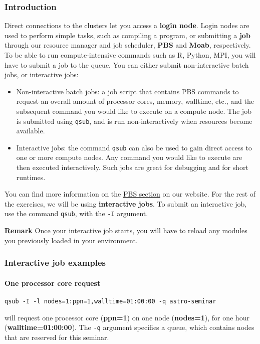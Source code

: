\documentclass[letterpaper,10pt]{article}
\begin{document}
\subsubsection{Introduction}
Direct connections to the clusters let you access a \textbf{login node}. Login nodes are used to perform simple tasks, such as compiling a program, or submitting a \textbf{job} through our resource manager and job scheduler, \textbf{PBS} and \textbf{Moab}, respectively. 
To be able to run compute-intensive commands such as R, Python, MPI, you will have to submit a job to the queue. You can either submit non-interactive batch jobs, or interactive jobs:
\begin{itemize}
 \item Non-interactive batch jobs: a job script that contains PBS commands to request an overall amount of processor cores, memory, walltime, etc., and the subsequent command you would like to execute on a compute node. The job is submitted using \texttt{qsub}, and is run non-interactively 
 when resources become available.
 \item Interactive jobs: the command \texttt{qsub} can also be used to gain direct access to one or more compute nodes. Any command you would like to execute are then executed interactively. Such jobs are great for debugging and for short runtimes.
\end{itemize}
You can find more information on the \href{http://rcc.its.psu.edu/user_guides/system_utilities/pbs/}{PBS section} on our website. 
For the rest of the exercises, we will be using \textbf{interactive jobs}. To submit an interactive job, use the command \texttt{qsub}, with the \texttt{-I} argument.

\textbf{Remark} Once your interactive job starts, you will have to reload any modules you previously loaded in your environment.


\subsubsection{Interactive job examples}
\paragraph{One processor core request}
\begin{center}
\texttt{qsub -I -l nodes=1:ppn=1,walltime=01:00:00 -q astro-seminar}
\end{center}

will request one processor core (\textbf{ppn=1}) on one node (\textbf{nodes=1}), for one hour (\textbf{walltime=01:00:00}). The \texttt{-q} argument specifies a queue, which contains nodes that are reserved for this seminar.
\end{document}
